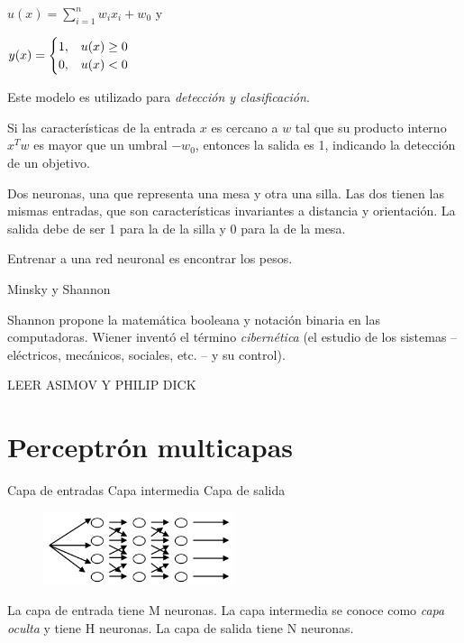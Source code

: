 $
u(x) = \sum_{i=1}^{n} w_i x_i + w_0 
$
y

$
y(x) = \begin{cases}
1, \hspace{0.3cm} u(x) \geq 0    \\
0,\hspace{0.3cm}   u(x) < 0  
\end{cases}
$

Este modelo es utilizado para \textit{detección y clasificación}.

Si las características de la entrada $x$ es cercano a $w$ tal que su producto interno $x^Tw$ es mayor que un
umbral $-w_0$, entonces la salida es 1, indicando la detección de un objetivo.


\begin{ejemplo}
	Dos neuronas, una que representa una mesa y otra una silla.
	Las dos tienen las mismas entradas, que son características invariantes a distancia y orientación. La salida
	debe de ser 1 para la de la silla y 0 para la de la mesa.
\end{ejemplo}

\begin{nota} Entrenar a una red neuronal es encontrar los pesos. \end{nota}


Minsky y Shannon

Shannon propone la matemática booleana y notación binaria en las computadoras.
Wiener inventó el término \textit{cibernética} (el estudio de los sistemas – eléctricos, mecánicos, sociales, etc. – y su control).


LEER ASIMOV Y PHILIP DICK

\section{Perceptrón multicapas}

Capa de entradas
Capa intermedia
Capa de salida

\begin{figure}[h!]
	\centering
	\includegraphics[width=0.5\textwidth]{images/img76.png}
	\label{figura76}
\end{figure}

La capa de entrada tiene M neuronas.
La capa intermedia se conoce como \textit{capa oculta} y tiene H neuronas.
La capa de salida tiene N neuronas.


